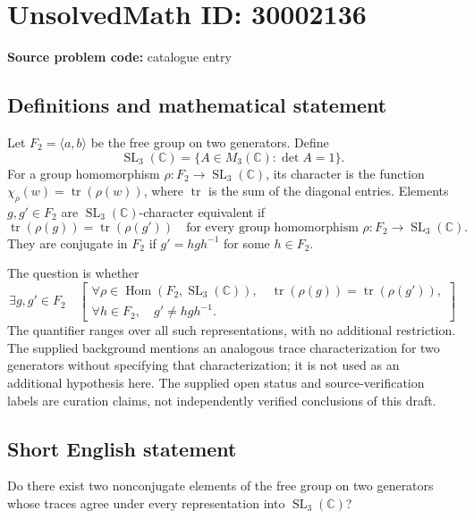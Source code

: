\documentclass[11pt]{article}
\newcommand{\C}{\mathbb{C}}
\begin{document}
\section*{UnsolvedMath ID: 30002136}
\textbf{Source problem code:} catalogue entry
\subsection{Definitions and mathematical statement}
Let \(F_2=\langle a,b\rangle\) be the free group on two generators. Define
\[
\operatorname{SL}_3(\C)=\{A\in M_3(\C):\det A=1\}.
\]
For a group homomorphism \(\rho:F_2\to\operatorname{SL}_3(\C)\), its character is the function \(\chi_\rho(w)=\operatorname{tr}(\rho(w))\), where \(\operatorname{tr}\) is the sum of the diagonal entries. Elements \(g,g'\in F_2\) are \(\operatorname{SL}_3(\C)\)-character equivalent if
\[
\operatorname{tr}(\rho(g))=\operatorname{tr}(\rho(g'))
\quad\text{for every group homomorphism }\rho:F_2\to\operatorname{SL}_3(\C).
\]
They are conjugate in \(F_2\) if \(g'=hgh^{-1}\) for some \(h\in F_2\).

The question is whether
\[
\exists g,g'\in F_2\quad
\left[
\begin{gathered}
\forall\rho\in\operatorname{Hom}(F_2,\operatorname{SL}_3(\C)),\quad
\operatorname{tr}(\rho(g))=\operatorname{tr}(\rho(g')),\\
\forall h\in F_2,\quad g'\ne hgh^{-1}.
\end{gathered}
\right]
\]
The quantifier ranges over all such representations, with no additional restriction. The supplied background mentions an analogous trace characterization for two generators without specifying that characterization; it is not used as an additional hypothesis here. The supplied open status and source-verification labels are curation claims, not independently verified conclusions of this draft.
\subsection{Short English statement}
Do there exist two nonconjugate elements of the free group on two generators whose traces agree under every representation into \(\operatorname{SL}_3(\C)\)?
\end{document}
